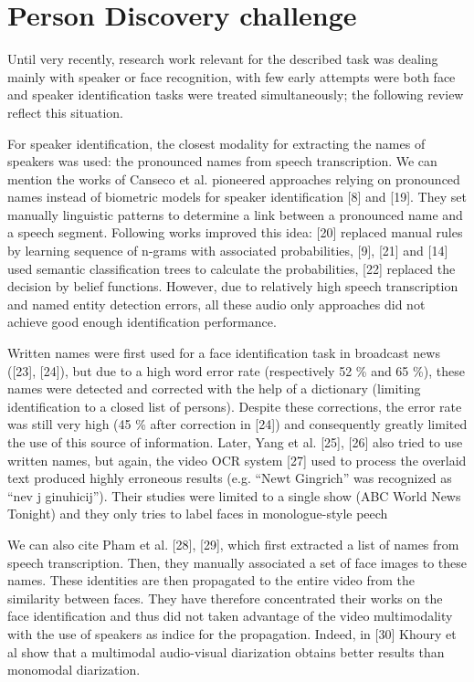 \section{Person Discovery challenge}
\label{sec:challenge}

Until very recently, research work relevant for the described task was dealing mainly with speaker or face recognition, with
few early attempts were both face and speaker identification tasks were treated simultaneously; the following review reflect
this situation.

For speaker identification, the closest modality for extracting the names of speakers was used: the pronounced names
from speech transcription. We can mention the works of Canseco et al. pioneered approaches relying on pronounced
names instead of biometric models for speaker identification [8] and [19]. They set manually linguistic patterns to
determine a link between a pronounced name and a speech segment. Following works improved this idea: [20] replaced
manual rules by learning sequence of n-grams with associated probabilities, [9], [21] and [14] used semantic classification
trees to calculate the probabilities, [22] replaced the decision by belief functions. However, due to relatively high speech
transcription and named entity detection errors, all these audio only approaches did not achieve good enough identification
performance.

Written names were first used for a face identification task in broadcast news ([23], [24]), but due to a high word error rate
(respectively 52 \% and 65 \%), these names were detected and corrected with the help of a dictionary (limiting identification
to a closed list of persons). Despite these corrections, the error rate was still very high (45 \% after correction in [24])
and consequently greatly limited the use of this source of information. Later, Yang et al. [25], [26] also tried to use
written names, but again, the video OCR system [27] used to process the overlaid text produced highly erroneous results
(e.g. “Newt Gingrich” was recognized as “nev j ginuhicij”). Their studies were limited to a single show (ABC World News
Tonight) and they only tries to label faces in monologue-style peech

We can also cite Pham et al. [28], [29], which first extracted a list of names from speech transcription. Then, they manually
associated a set of face images to these names. These identities are then propagated to the entire video from the similarity
between faces. They have therefore concentrated their works on the face identification and thus did not taken advantage
of the video multimodality with the use of speakers as indice for the propagation. Indeed, in [30] Khoury et al show that a
multimodal audio-visual diarization obtains better results than monomodal diarization.

